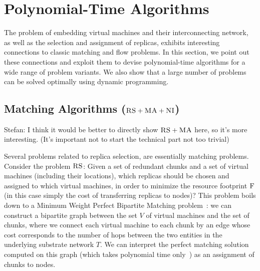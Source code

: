 \documentclass[9pt,twocolumn]{scrartcl}
\newcommand{\Capacity}{\ensuremath{\textsc{cap}}}
\newcommand{\VirtualNodes}{\ensuremath{V}}
\newcommand{\CC}{\textsc{NI}}
\newcommand{\RS}{\textsc{RS}}
\newcommand{\MA}{\textsc{MA}}
\newcommand{\Cost}{\textsc{F}}
\newcommand{\Tree}{\ensuremath{T}}
\newcommand{\CostCom}{\ensuremath{b_1}}
\newcommand{\CostTrans}{\ensuremath{b_2}}
\begin{document}
\section{Polynomial-Time Algorithms}\label{sec:poly}

The problem of embedding virtual machines and their interconnecting network,
as well as the selection and assignment of replicas, 
exhibits interesting connections to classic matching and
flow problems. In this section, we point out these connections and
exploit them to devise polynomial-time algorithms for a wide range
of problem variants. We also show that a large number of problems
can be solved optimally using dynamic programming. 


\subsection{Matching Algorithms ($\RS+\MA+\CC$)}

Stefan: I think it would be better to directly show $\RS+\MA$ here, so it's more interesting. (It's important not to start the technical part not too trivial)

Several problems related to replica selection,
are essentially matching problems. Consider the problem $\RS$:
Given a set of redundant chunks and a set of virtual machines (including
their locations), which replicas should be chosen and assigned to which
virtual machines, in order to minimize the resource footprint $\Cost$ (in this case
simply the cost of transferring replicas to nodes)? 
This problem boils down to a Minimum Weight
Perfect Bipartite
Matching problem~\cite{schrijver_combinatorial_optimization}:
we can construct a bipartite graph between the set $\VirtualNodes$ of virtual machines and 
the set of chunks, where we connect each virtual machine to 
each chunk by an edge whose cost corresponds to the number of hops between the
two entities in the underlying substrate network $\Tree$.
We can interpret the perfect matching solution computed on this graph (which takes polynomial time only~\cite{schrijver_combinatorial_optimization})
as an assignment of chunks to nodes. 
\end{document}
